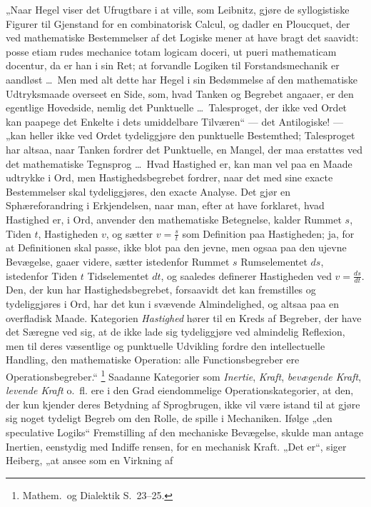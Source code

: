 \documentclass[12pt]{book}
\newcommand{\opage}[1]{\marginnote{\footnotesize\textit{[#1]}}}
\begin{document}
„Naar Hegel viser det Ufrugtbare i at ville, som Leibnitz, gjøre de syllogistiske
Figurer til Gjenstand for en combinatorisk Calcul, og dadler en Ploucquet, der ved
mathematiske Bestemmelser af det Logiske mener at have bragt det saavidt: posse etiam
rudes mechanice totam logicam doceri, ut pueri mathematicam docentur, da er han i sin
Ret; at forvandle Logiken til Forstandsmechanik er aandløst \ldots\ Men med alt dette
har Hegel i sin Bedømmelse af den mathematiske Udtryksmaade overseet en Side, som, hvad
Tanken og Begrebet angaaer, er den egentlige Hovedside, nemlig det Punktuelle \ldots\
Talesproget, der ikke ved Ordet kan paapege det Enkelte i dets umiddelbare Tilværen“ ---
det Antilogiske! ---
\opage{336} „kan heller ikke ved Ordet tydeliggjøre den punktuelle Bestemthed; Talesproget har
altsaa, naar Tanken fordrer det Punktuelle, en Mangel, der maa erstattes ved det
mathematiske Tegnsprog \ldots\ Hvad Hastighed er, kan man vel paa en Maade udtrykke i
Ord, men Hastighedsbegrebet fordrer, naar det med sine exacte Bestemmelser skal
tydeliggjøres, den exacte Analyse. Det gjør en Sphæreforandring i Erkjendelsen, naar
man, efter at have forklaret, hvad Hastighed er, i Ord, anvender den mathematiske
Betegnelse, kalder Rummet $s$, Tiden $t$, Hastigheden $v$, og sætter $v = \frac{s}{t}$
som Definition paa Hastigheden; ja, for at Definitionen skal passe, ikke blot paa den
jevne, men ogsaa paa den ujevne Bevægelse, gaaer videre, sætter istedenfor Rummet $s$
Rumselementet $ds$, istedenfor Tiden $t$ Tidselementet $dt$, og saaledes definerer
Hastigheden ved $v = \frac{ds}{dt}$. Den, der kun har Hastighedsbegrebet, forsaavidt det
kan fremstilles og tydeliggjøres i Ord, har det kun i svævende Almindelighed, og altsaa
paa en overfladisk Maade. Kategorien \emph{Hastighed} hører til en Kreds af Begreber,
der have det Særegne ved sig, at de ikke lade sig tydeliggjøre ved almindelig Reflexion,
men til deres væsentlige og punktuelle Udvikling fordre den intellectuelle Handling, den
mathematiske Operation: alle Functionsbegreber ere Operationsbegreber.“%
\footnote{Mathem.\ og Dialektik S.~23--25.}
Saadanne Kategorier som \emph{Inertie}, \emph{Kraft}, \emph{bevægende Kraft},
\emph{levende Kraft} o.\ fl. ere i den Grad eiendommelige Operationskategorier, at den,
der kun kjender deres Betydning af Sprogbrugen, ikke vil være istand til at gjøre sig
noget tydeligt Begreb om den Rolle, de spille i Mechaniken. Ifølge „den speculative
Logiks“ Fremstilling af den mechaniske Bevægelse, skulde man antage Inertien, eenstydig
med Indiffe\-%
rensen, for en mechanisk Kraft. „Det er“, siger Heiberg, „at ansee som en Virkning af
\end{document}

